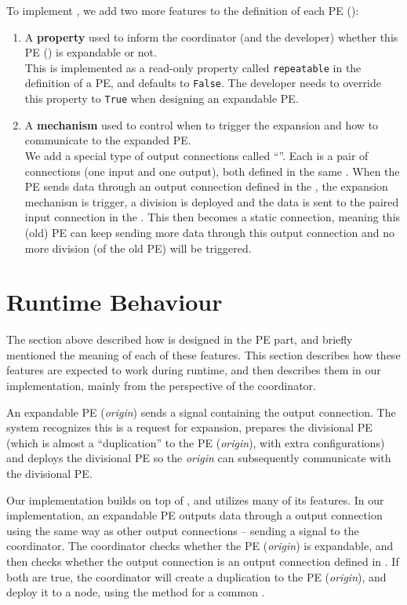 To implement \tdynexp, we add two more features to the definition of each PE (\tPETmpl):


\begin{enumerate}
	\item A \textbf{property} used to inform the coordinator (and the developer) whether this PE (\tPETmpl) is expandable or not. \\
	This is implemented as a read-only property called \lstinline|repeatable| in the definition of a PE, and defaults to \lstinline|False|. The developer needs to override this property to \lstinline|True| when designing an expandable PE.
	\item A \textbf{mechanism} used to control when to trigger the expansion and how to communicate to the expanded PE. \\
	We add a special type of output connections called ``\tcircuit''. Each \tcircuit is a pair of connections (one input and one output), both defined in the same \tPETmpl. When the PE sends data through an output connection defined in the \tcircuit, the expansion mechanism is trigger, a division is deployed and the data is sent to the paired input connection in the \tcircuit. This \tcircuit then becomes a static connection, meaning this (old) PE can keep sending more data through this output connection and no more division (of the old PE) will be triggered.
\end{enumerate}

\section{Runtime Behaviour}
The section above described how \tdynexp is designed in the PE part, and briefly mentioned the meaning of each of these features. This section describes how these features are expected to work during runtime, and then describes them in our implementation, mainly from the perspective of the coordinator.

An expandable PE (\emph{origin}) sends a signal containing the \tcircuit output connection. The system recognizes this is a request for expansion, prepares the divisional PE (which is almost a ``duplication'' to the PE (\emph{origin}), with extra configurations) and deploys the divisional PE so the \emph{origin} can subsequently communicate with the divisional PE.

Our implementation builds on top of \tincdep, and utilizes many of its features. In our implementation, an expandable PE outputs data through a \tcircuit output connection using the same way as other output connections -- sending a signal to the coordinator. The coordinator checks whether the PE (\emph{origin}) is expandable, and then checks whether the output connection is an output connection defined in \tcircuit. If both are true, the coordinator will create a duplication to the PE (\emph{origin}), and deploy it to a node, using the method for a common \tincdep.

